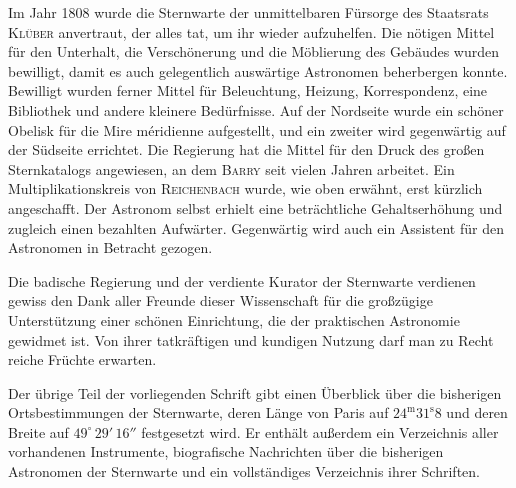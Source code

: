 Im Jahr 1808 wurde die Sternwarte der unmittelbaren Fürsorge des Staatsrats \textsc{Klüber} anvertraut, der alles tat, um ihr wieder aufzuhelfen. Die nötigen Mittel für den Unterhalt, die Verschönerung und die Möblierung des Gebäudes wurden bewilligt, damit es auch gelegentlich auswärtige Astronomen beherbergen konnte. Bewilligt wurden ferner Mittel für Beleuchtung, Heizung, Korrespondenz, eine Bibliothek und andere kleinere Bedürfnisse. Auf der Nordseite wurde ein schöner Obelisk für die Mire méridienne aufgestellt, und ein zweiter wird gegenwärtig auf der Südseite errichtet. Die Regierung hat die Mittel für den Druck des großen Sternkatalogs angewiesen, an dem \textsc{Barry} seit vielen Jahren arbeitet. Ein Multiplikationskreis von \textsc{Reichenbach} wurde, wie oben erwähnt, erst kürzlich angeschafft. Der Astronom selbst erhielt eine beträchtliche Gehaltserhöhung und zugleich einen bezahlten Aufwärter. Gegenwärtig wird auch ein Assistent für den Astronomen in Betracht gezogen.

Die badische Regierung und der verdiente Kurator der Sternwarte verdienen gewiss den Dank aller Freunde dieser Wissenschaft für die großzügige Unterstützung einer schönen Einrichtung, die der praktischen Astronomie gewidmet ist. Von ihrer tatkräftigen und kundigen Nutzung darf man zu Recht reiche Früchte erwarten.

Der übrige Teil der vorliegenden Schrift gibt einen Überblick über die bisherigen Ortsbestimmungen der Sternwarte, deren Länge von Paris auf $24^{\mathrm m}31^{\mathrm s}8$ und deren Breite auf $49^\circ\,29'\,16''$ festgesetzt wird. Er enthält außerdem ein Verzeichnis aller vorhandenen Instrumente, biografische Nachrichten über die bisherigen Astronomen der Sternwarte und ein vollständiges Verzeichnis ihrer Schriften.
